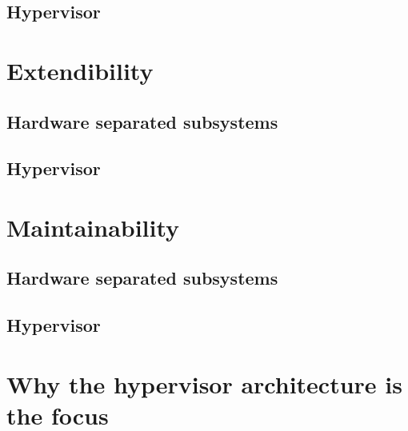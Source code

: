 \subsection{Hypervisor}


\section{Extendibility}
\subsection{Hardware separated subsystems}
\subsection{Hypervisor}


\section{Maintainability}
\subsection{Hardware separated subsystems}
\subsection{Hypervisor}


\section{Why the hypervisor architecture is the focus}